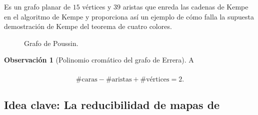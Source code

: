 \documentclass[spanish, utf8,handout]{beamer} %
\theoremstyle{definition}
\newtheorem{remark}{Observación}
\begin{document}
\begin{frame}[allowframebreaks]
\begin{example}
Es un grafo planar de $15$ vértices y $39$ aristas que enreda las cadenas de Kempe en el algoritmo de Kempe y proporciona así un ejemplo de cómo falla la supuesta demostración de Kempe del teorema de cuatro colores.
\end{example}

\begin{figure}[H]
	\centering
	\scalebox{0.6}{}
	\caption{Grafo de Poussin.}
\end{figure}

\begin{remark}[Polinomio cromático del grafo de Errera]
A
\end{remark}
\end{frame}

\begin{frame}\transblindsvertical
\frametitle{\insertsubsection}

\begin{theorem}
\begin{equation*}
\#\text{caras} - \#\text{aristas} + \#\text{vértices} = 2.	
\end{equation*}
\end{theorem}


\end{frame}

\subsection{Idea clave: La reducibilidad de mapas de \citeauthor{birkhoff}}
\end{document}
